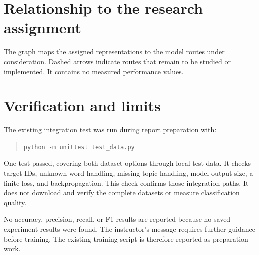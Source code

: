 \documentclass[11pt,a4paper]{article}
\begin{document}
\section{Relationship to the research assignment}
The graph maps the assigned representations to the model routes under consideration. Dashed arrows indicate routes that remain to be studied or implemented. It contains no measured performance values.
\begin{center}
\end{center}

\section{Verification and limits}
The existing integration test was run during report preparation with:
\begin{quote}
\texttt{python -m unittest test\_data.py}
\end{quote}
One test passed, covering both dataset options through local test data. It checks target IDs, unknown-word handling, missing topic handling, model output size, a finite loss, and backpropagation. This check confirms those integration paths. It does not download and verify the complete datasets or measure classification quality.

No accuracy, precision, recall, or F1 results are reported because no saved experiment results were found. The instructor's message requires further guidance before training. The existing training script is therefore reported as preparation work.
\end{document}
